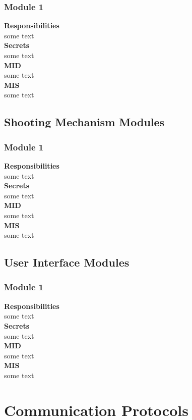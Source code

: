 \documentclass[11pt]{article}
\begin{document}
\subsubsection*{Module 1}
\textbf{Responsibilities} \\
some text \\
\textbf{Secrets} \\ 
some text \\ 
\textbf{MID} \\
some text \\
\textbf{MIS} \\
some text \\
\subsection{Shooting Mechanism Modules}
\subsubsection*{Module 1}
\textbf{Responsibilities} \\
some text \\
\textbf{Secrets} \\ 
some text \\ 
\textbf{MID} \\
some text \\
\textbf{MIS} \\
some text \\
\subsection{User Interface Modules}
\subsubsection*{Module 1}
\textbf{Responsibilities} \\
some text \\
\textbf{Secrets} \\ 
some text \\ 
\textbf{MID} \\
some text \\
\textbf{MIS} \\
some text \\

\section{Communication Protocols} %
\end{document}
